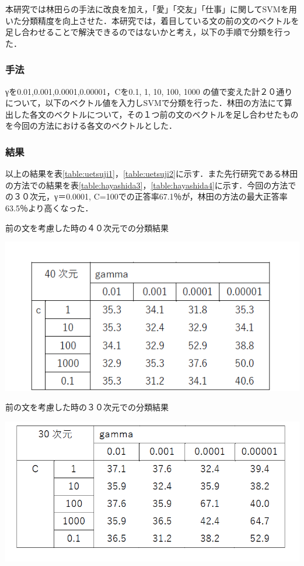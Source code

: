 \documentclass[shuuron]{kuee}
\begin{document}
本研究では林田らの手法に改良を加え，「愛」「交友」「仕事」に関してSVMを用いた分類精度を向上させた．本研究では，着目している文の前の文のベクトルを足し合わせることで解決できるのではないかと考え，以下の手順で分類を行った．

\subsubsection{手法}
γを0.01,0.001,0.0001,0.00001，Cを0.1, 1, 10, 100, 1000
の値で変えた計２０通りについて，以下のベクトル値を入力しSVMで分類を行った．林田の方法にて算出した各文のベクトルについて，その１つ前の文のベクトルを足し合わせたものを今回の方法における各文のベクトルとした．

\subsubsection{結果}
以上の結果を表\ref{table:uetsuji1}，\ref{table:uetsuji2}に示す．また先行研究である林田の方法での結果を表\ref{table:hayashida3}，\ref{table:hayashida4}に示す．今回の方法での３０次元，γ＝0.0001, C=100での正答率67.1％が，林田の方法の最大正答率63.5％より高くなった．

\begin{table}
  \caption{前の文を考慮した時の４０次元での分類結果}
  \label{table:uetsuji1}
  \begin{center}
    \includegraphics[width=\linewidth]{uetsuji1.png}
  \end{center}
\end{table}

\begin{table}
  \caption{前の文を考慮した時の３０次元での分類結果}
  \label{table:uetsuji2}
  \begin{center}
    \includegraphics[width=\linewidth]{uetsuji2.png}
  \end{center}
\end{table}
\end{document}
